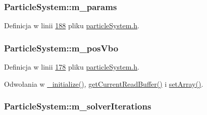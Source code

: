 \hypertarget{class_particle_system_ab765472aed6a1b5f0d2f98a3a906c417}{
\subsubsection[{m\-\_\-params}]{ Particle\-System\-::m\-\_\-params\hspace{0.3cm}{\ttfamily [protected]}}}\label{class_particle_system_ab765472aed6a1b5f0d2f98a3a906c417}


Definicja w linii \hyperlink{particle_system_8h_source_l00188}{188} pliku \hyperlink{particle_system_8h_source}{particle\-System.\-h}.

\hypertarget{class_particle_system_a31f9cccdf5dbae6f72867665bd8761e3}{
\subsubsection[{m\-\_\-pos\-Vbo}]{ Particle\-System\-::m\-\_\-pos\-Vbo\hspace{0.3cm}{\ttfamily [protected]}}}\label{class_particle_system_a31f9cccdf5dbae6f72867665bd8761e3}


Definicja w linii \hyperlink{particle_system_8h_source_l00178}{178} pliku \hyperlink{particle_system_8h_source}{particle\-System.\-h}.



Odwołania w \hyperlink{particle_system_8cpp_source_l00123}{\-\_\-initialize()}, \hyperlink{particle_system_8h_source_l00053}{get\-Current\-Read\-Buffer()} i \hyperlink{particle_system_8cpp_source_l00374}{set\-Array()}.

\hypertarget{class_particle_system_a7b4b053433c052518b8ecce1b02000f5}{
\subsubsection[{m\-\_\-solver\-Iterations}]{ Particle\-System\-::m\-\_\-solver\-Iterations\hspace{0.3cm}{\ttfamily [protected]}}}\label{class_particle_system_a7b4b053433c052518b8ecce1b02000f5}


